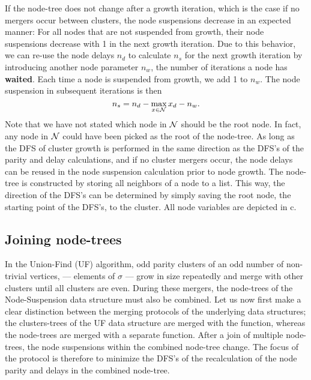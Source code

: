 If the node-tree does not change after a growth iteration, which is the case if no mergers occur between clusters, the node suspensions decrease in an expected manner: For all nodes that are not suspended from growth, their node suspensions decrease with 1 in the next growth iteration. Due to this behavior, we can re-use the node delays $n_d$ to calculate $n_s$ for the next growth iteration by introducing another node parameter $n_w$, the number of iterations a node has \textbf{waited}. Each time a node is suspended from growth, we add 1 to $n_w$. The node suspension in subsequent iterations is then
\begin{equation}\label{eq:suspension}
    n_s = n_d - \max_{x \in \nset}{x_d} - n_w. 
\end{equation}
Note that we have not stated which node in $\mathcal{N}$ should be the root node. In fact, any node in $\mathcal{N}$ could have been picked as the root of the node-tree. As long as the DFS of cluster growth is performed in the same direction as the DFS's of the parity and delay calculations, and if no cluster mergers occur, the node delays can be reused in the node suspension calculation prior to node growth. 
The node-tree is constructed by storing all neighbors of a node to a list. This way, the direction of the DFS's can be determined by simply saving the root node, the starting point of the DFS's, to the cluster. All node variables are depicted in c. 


\subsection{Joining node-trees}\label{sec:nodejoin}

In the Union-Find (UF) algorithm, odd parity clusters of an odd number of non-trivial vertices, --- elements of $\sigma$ --- grow in size repeatedly and merge with other clusters until all clusters are even. During these mergers, the node-trees of the Node-Suspension data structure must also be combined. Let us now first make a clear distinction between the merging protocols of the underlying data structures; the clusters-trees of the UF data structure are merged with the  function, whereas the node-trees are merged with a separate  function. After a join of multiple node-trees, the node suspensions within the combined node-tree change. The focus of the  protocol is therefore to minimize the DFS's of the recalculation of the node parity and delays in the combined node-tree. 

